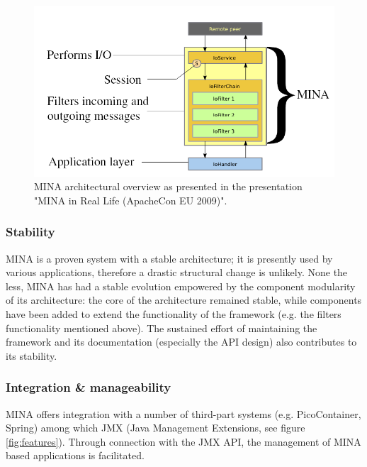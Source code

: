 \begin{figure}
    \centering
    \includegraphics[width=\textwidth]{images/architectural_overview.png}
    \caption{MINA architectural overview as presented in the presentation "MINA in Real Life (ApacheCon EU 2009)".}
    \label{fig:architecture}
\end{figure}




\subsubsection{Stability}
MINA is a proven system with a stable architecture; it is presently used by various applications, therefore a drastic structural change is unlikely. None the less, MINA has had a stable evolution empowered by the component modularity of its architecture: the core of the architecture remained stable, while components have been added to extend the functionality of the framework (e.g. the filters functionality mentioned above). The sustained effort of maintaining the framework and its documentation (especially the API design) also contributes to its stability.


\subsubsection{Integration \& manageability}
MINA offers integration with a number of third-part systems (e.g. PicoContainer, Spring) among which JMX (Java Management Extensions, see figure \ref{fig:features}). Through connection with the JMX API, the management of MINA based applications is facilitated.

